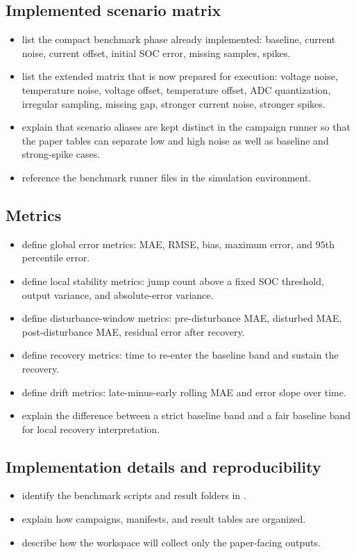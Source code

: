 \documentclass[review]{elsarticle}
\newcommand{\code}[1]{\path{#1}}
\begin{document}
\subsection{Implemented scenario matrix}
\begin{itemize}[leftmargin=*]
    \item list the compact benchmark phase already implemented: baseline, current noise, current offset, initial SOC error, missing samples, spikes.
    \item list the extended matrix that is now prepared for execution: voltage noise, temperature noise, voltage offset, temperature offset, ADC quantization, irregular sampling, missing gap, stronger current noise, stronger spikes.
    \item explain that scenario aliases are kept distinct in the campaign runner so that the paper tables can separate low and high noise as well as baseline and strong-spike cases.
    \item reference the benchmark runner files in the simulation environment.
\end{itemize}

\subsection{Metrics}
\begin{itemize}[leftmargin=*]
    \item define global error metrics: MAE, RMSE, bias, maximum error, and $95$th percentile error.
    \item define local stability metrics: jump count above a fixed SOC threshold, output variance, and absolute-error variance.
    \item define disturbance-window metrics: pre-disturbance MAE, disturbed MAE, post-disturbance MAE, residual error after recovery.
    \item define recovery metrics: time to re-enter the baseline band and sustain the recovery.
    \item define drift metrics: late-minus-early rolling MAE and error slope over time.
    \item explain the difference between a strict baseline band and a fair baseline band for local recovery interpretation.
\end{itemize}

\subsection{Implementation details and reproducibility}
\begin{itemize}[leftmargin=*]
    \item identify the benchmark scripts and result folders in \code{4\_simulation\_environment}.
    \item explain how campaigns, manifests, and result tables are organized.
    \item describe how the \code{results/} workspace will collect only the paper-facing outputs.
\end{itemize}
\end{document}
